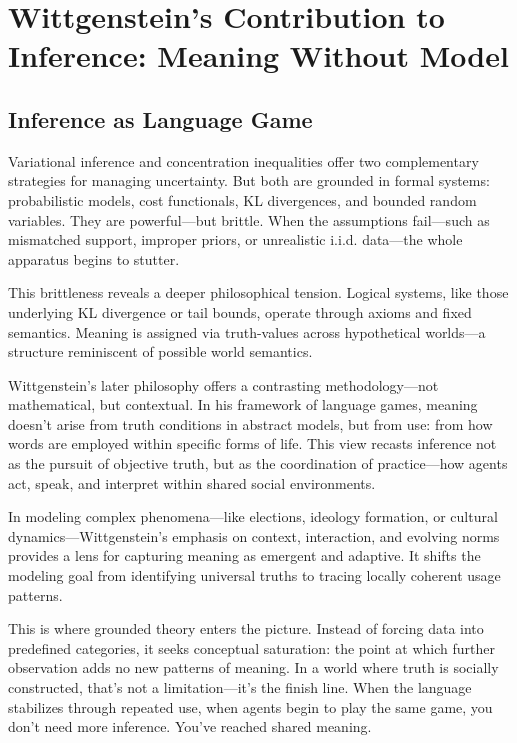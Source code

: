 \section{Wittgenstein’s Contribution to Inference: Meaning Without Model}

\subsection{Inference as Language Game}

Variational inference and concentration inequalities offer two complementary strategies for managing uncertainty. But both are grounded in formal systems: probabilistic models, cost functionals, KL divergences, and bounded random variables. They are powerful—but brittle. When the assumptions fail—such as mismatched support, improper priors, or unrealistic i.i.d. data—the whole apparatus begins to stutter.

This brittleness reveals a deeper philosophical tension. Logical systems, like those underlying KL divergence or tail bounds, operate through axioms and fixed semantics. Meaning is assigned via truth-values across hypothetical worlds—a structure reminiscent of possible world semantics.

Wittgenstein’s later philosophy offers a contrasting methodology—not mathematical, but contextual. In his framework of language games, meaning doesn’t arise from truth conditions in abstract models, but from use: from how words are employed within specific forms of life. This view recasts inference not as the pursuit of objective truth, but as the coordination of practice—how agents act, speak, and interpret within shared social environments.

In modeling complex phenomena—like elections, ideology formation, or cultural dynamics—Wittgenstein’s emphasis on context, interaction, and evolving norms provides a lens for capturing meaning as emergent and adaptive. It shifts the modeling goal from identifying universal truths to tracing locally coherent usage patterns.

This is where grounded theory enters the picture. Instead of forcing data into predefined categories, it seeks conceptual saturation: the point at which further observation adds no new patterns of meaning. In a world where truth is socially constructed, that’s not a limitation—it’s the finish line. When the language stabilizes through repeated use, when agents begin to play the same game, you don’t need more inference. You’ve reached shared meaning.

